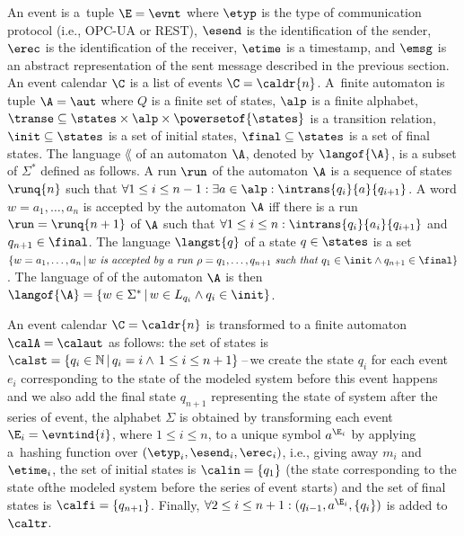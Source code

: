 {An event is a~tuple $\E = \evnt$ where $\etyp$ is the type of
communication protocol (i.e., OPC-UA or REST), $\esend$ is the identification
of the sender, $\erec$ is the identification of the receiver, $\etime$ is a
timestamp, and $\emsg$ is an abstract representation of the sent message described in the previous section.
An event calendar $\C$ is a list of events $\C = \caldr{n}$.
%
A~finite automaton is tuple $\A=\aut$ where $Q$ is a finite set of states,
$\alp$ is a finite alphabet, $\transe \subseteq \states\times \alp \times
\powersetof{\states}$ is a transition relation, $\init\subseteq \states$ is a
set of initial states, $\final\subseteq \states$ is a set of final states.  The
language $\lang$ of an automaton $\A$, denoted by $\langof{\A}$, is a subset of
$\Sigma^*$ defined as follows. A run $\run$ of the automaton $\A$ is a sequence of states $\runq{n}$
such that $\forall 1 \leq i \leq n-1: \exists a\in \alp:
\intrans{q_i}{a}{q_{i+1}}$.  A word $w=a_1,\ldots,a_n$ is accepted by the
automaton $\A$
iff there is a run $\run=\runq{n+1}$ of $\A$ such that $\forall 1 \leq i \leq n:
\intrans{q_i}{a_i}{q_{i+1}}$ and $q_{n+1}\in \final$.  The language $\langst{q}$ of
a state $q\in \states$ is a set $\{w=a_1,\ldots,a_n\,|\, w\emph{ is accepted by
a run }\rho=q_1,\ldots,q_{n+1} \emph{ such that } q_1\in\init \wedge q_{n+1}\in
\final\}$.
The language of of the automaton $\A$ is then $\langof{\A}=\{w\in\Sigma^*\,|\,w\in L_{q_i} \wedge q_i \in \init\}$.

An event calendar $\C=\caldr{n}$ is transformed to a finite automaton
$\calA=\calaut$ as follows: the set of states is
$\calst=\{q_i\in \mathbb{N}\,|\, q_i = i \wedge \,1\leq i \leq n+1\}$\,--\,we create the state $q_i$ for each event $e_i$ corresponding to the state of the
modeled system before this event happens and we also add the final state $q_{n+1}$ representing the state of
system after the series of event, the alphabet $\Sigma$ is obtained by
transforming each event $\E_i=\evntind{i}$, where $1 \leq i \leq n$, to a unique symbol $a^{\E_i}$ by applying
a~hashing function over $(\etyp_i,\esend_i,\erec_i)$, i.e., giving away $m_i$ and $\etime_i$,
the set of initial states is $\calin=\{q_1\}$ (the state corresponding to the state ofthe  modeled system before the series of event starts)
and the set of final states is $\calfi=\{q_{n+1}\}$.  Finally, $\forall 2 \leq i \leq n+1:
(q_{i-1},a^{\E_i},\{q_{i}\})$ is added to $\caltr$.  

}
